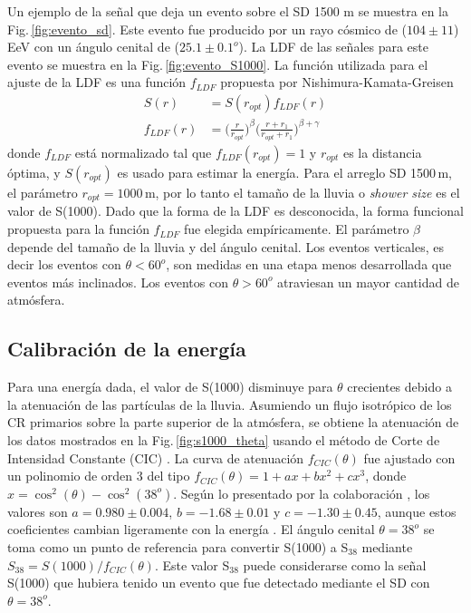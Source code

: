 Un ejemplo de la señal que deja un evento sobre el SD 1500 m se muestra en la Fig.\,\ref{fig:evento_sd}. Este evento fue producido por un rayo cósmico de ($104\pm11$)\,EeV con un ángulo cenital de ($25.1\pm0.1 ^o$). La LDF de las señales para este evento se muestra en la Fig.\,\ref{fig:evento_S1000}. La función utilizada para el ajuste de la LDF es una función  $f_{LDF}$ propuesta por Nishimura-Kamata-Greisen \cite{data}
\begin{align*}
	S(r) &= S(r_{opt})f_{LDF}(r)\\
	f_{LDF}(r)&=\bigg(\frac{r}{r_{opt}}\bigg)^{\beta}\bigg(\frac{r+r_1}{r_{opt}+r_1}\bigg)^{\beta + \gamma}
\end{align*}
donde $f_{LDF}$ está normalizado tal que $f_{LDF}(r_{opt})=1$ y $r_{opt}$ es la distancia óptima, %
y $S(r_{opt})$ es usado para estimar la energía. Para el arreglo SD 1500\,m, el parámetro $r_{opt}=1000\,$m, por lo tanto el tamaño de la lluvia o \emph{shower size} es el valor de S(1000). Dado que la forma de la LDF es desconocida, la forma funcional propuesta para la función $f_{LDF}$ fue elegida empíricamente.  El parámetro $\beta$ depende del tamaño de la lluvia y del ángulo cenital. Los eventos verticales, es decir los eventos con $\theta < 60^o$, son medidas en una etapa menos desarrollada que eventos más inclinados. Los eventos con $\theta>60^o$ atraviesan un mayor cantidad de atmósfera.

\subsection{Calibración de la energía} \label{sec:gamma_B}

Para una energía dada, el valor de S(1000) disminuye para $\theta$ crecientes debido a la atenuación de las partículas de la lluvia. Asumiendo un flujo isotrópico de los CR primarios sobre la parte superior de la atmósfera, se obtiene la atenuación de los datos mostrados en la Fig.\,\ref{fig:s1000_theta}  usando el método de Corte de Intensidad Constante (CIC) \cite{CIC}. La curva de atenuación $f_{CIC}(\theta)$ fue ajustado con un polinomio de orden 3 del tipo $f_{CIC}(\theta)=1+ax+bx^2+cx^3$, donde $x=\cos^2(\theta) - \cos^2(38^o)$. Según lo presentado por la colaboración \cite{collaboration2013pierre}, los valores son $a=0.980\pm0.004$, $b=-1.68\pm0.01$ y $c=-1.30\pm 0.45$, aunque estos coeficientes cambian ligeramente con la energía \cite{data}. El ángulo cenital $\theta=38^o$ se toma como un punto de referencia para convertir S(1000) a S$_{38}$ mediante $S_{38}=S(1000)/f_{CIC}(\theta)$. Este valor S$_{38}$ puede considerarse como la señal S(1000) que hubiera tenido un evento que fue detectado mediante el SD con $\theta=38^o$.


